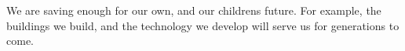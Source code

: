 We are saving enough for our own, and our childrens future. For example, the buildings we build, and the technology we develop will serve us for generations to come.

